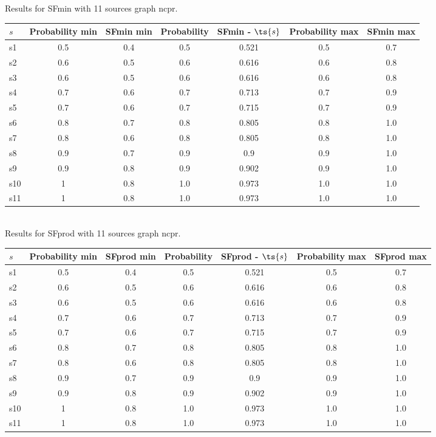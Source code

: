 \documentclass{article}
\begin{document}
\noindent Results for SFmin with 11 sources graph ncpr.

\noindent\begin{tabular}{|l|c|c|c|c|c|c|}
\hline
$s$& Probability min & SFmin min & Probability & SFmin - $\ts{s}$ & Probability max & SFmin max\\
\hline
s1 &0.5 & 0.4 & 0.5 & 0.521 & 0.5 & 0.7\\
\hline
s2 &0.6 & 0.5 & 0.6 & 0.616 & 0.6 & 0.8\\
\hline
s3 &0.6 & 0.5 & 0.6 & 0.616 & 0.6 & 0.8\\
\hline
s4 &0.7 & 0.6 & 0.7 & 0.713 & 0.7 & 0.9\\
\hline
s5 &0.7 & 0.6 & 0.7 & 0.715 & 0.7 & 0.9\\
\hline
s6 &0.8 & 0.7 & 0.8 & 0.805 & 0.8 & 1.0\\
\hline
s7 &0.8 & 0.6 & 0.8 & 0.805 & 0.8 & 1.0\\
\hline
s8 &0.9 & 0.7 & 0.9 & 0.9 & 0.9 & 1.0\\
\hline
s9 &0.9 & 0.8 & 0.9 & 0.902 & 0.9 & 1.0\\
\hline
s10 &1 & 0.8 & 1.0 & 0.973 & 1.0 & 1.0\\
\hline
s11 &1 & 0.8 & 1.0 & 0.973 & 1.0 & 1.0\\
\hline
\end{tabular}\\

\noindent Results for SFprod with 11 sources graph ncpr.

\noindent\begin{tabular}{|l|c|c|c|c|c|c|}
\hline
$s$& Probability min & SFprod min & Probability & SFprod - $\ts{s}$ & Probability max & SFprod max\\
\hline
s1 &0.5 & 0.4 & 0.5 & 0.521 & 0.5 & 0.7\\
\hline
s2 &0.6 & 0.5 & 0.6 & 0.616 & 0.6 & 0.8\\
\hline
s3 &0.6 & 0.5 & 0.6 & 0.616 & 0.6 & 0.8\\
\hline
s4 &0.7 & 0.6 & 0.7 & 0.713 & 0.7 & 0.9\\
\hline
s5 &0.7 & 0.6 & 0.7 & 0.715 & 0.7 & 0.9\\
\hline
s6 &0.8 & 0.7 & 0.8 & 0.805 & 0.8 & 1.0\\
\hline
s7 &0.8 & 0.6 & 0.8 & 0.805 & 0.8 & 1.0\\
\hline
s8 &0.9 & 0.7 & 0.9 & 0.9 & 0.9 & 1.0\\
\hline
s9 &0.9 & 0.8 & 0.9 & 0.902 & 0.9 & 1.0\\
\hline
s10 &1 & 0.8 & 1.0 & 0.973 & 1.0 & 1.0\\
\hline
s11 &1 & 0.8 & 1.0 & 0.973 & 1.0 & 1.0\\
\hline
\end{tabular}\\
\end{document}
